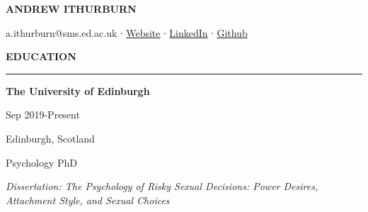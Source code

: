 \documentclass[
  16,
]{article}
\author{}
\date{}
\begin{document}
\ifdefined\Shaded\renewenvironment{Shaded}{\begin{tcolorbox}[boxrule=0pt, breakable, borderline west={3pt}{0pt}{shadecolor}, interior hidden, frame hidden, enhanced, sharp corners]}{\end{tcolorbox}}\fi

\begin{huge}\begin{center}{\bf ANDREW ITHURBURN}\end{center}\end{huge}

\begin{center}a.ithurburn@sms.ed.ac.uk ∙ \href{https://aithurburn.github.io/me/}{Website} ∙ \href{https://www.linkedin.com/in/andrew-ithurburn/}{LinkedIn} ∙ \href{https://github.com/aithurburn}{Github}
\end{center}
\vspace{15pt}

\begin{large}
  {\bf EDUCATION}
  \vspace{3pt}
  \hrule
  \begin{multicols}{2}
    \begin{flushleft}{\bf The University of Edinburgh}\end{flushleft}
    \begin{flushright}Sep 2019-Present\end{flushright}
    \begin{flushright}Edinburgh, Scotland\end{flushright}
  \end{multicols}
  \vspace{-0.17cm}
  \begin{multicols}{2}
    \begin{flushleft}Psychology PhD\end{flushleft}
  \end{multicols}
  \vspace{-0.25cm}
  \textit{Dissertation: The Psychology of Risky Sexual Decisions: Power Desires, Attachment Style, and Sexual Choices}
\end{large}

\vspace{0.2cm}
\end{document}
